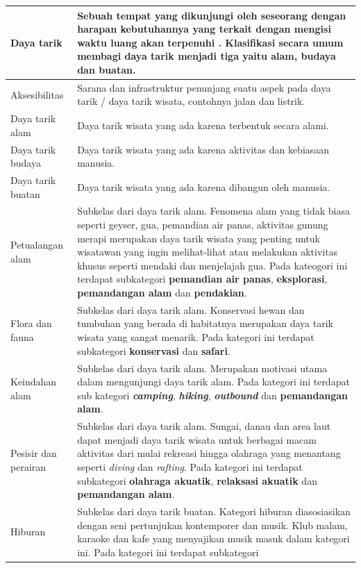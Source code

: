 \begin{center}
\begin{longtable}{ |l|m{10cm}| }
	\hline
	Daya tarik & Sebuah tempat yang dikunjungi oleh seseorang dengan harapan kebutuhannya yang terkait dengan mengisi waktu luang akan terpenuhi
	\cite{inskeep1991tourism}. Klasifikasi secara umum membagi daya tarik menjadi tiga yaitu alam, budaya dan buatan.\\
	\hline
	Aksesibilitas & Sarana dan infrastruktur penunjang suatu aspek pada daya tarik / daya tarik wisata, contohnya jalan dan listrik.\\
	\hline
	Daya tarik alam & Daya tarik wisata yang ada karena terbentuk secara alami.\\ 
	\hline
	Daya tarik budaya & Daya tarik wisata yang ada karena aktivitas dan kebiasaan manusia.\\
	\hline
	Daya tarik buatan & Daya tarik wisata yang ada karena dibangun oleh manusia.\\
	\hline
	Petualangan alam & Subkelas dari daya tarik alam. Fenomena alam yang tidak biasa seperti geyser, gua, pemandian air panas, aktivitas gunung
	merapi merupakan daya tarik wisata yang penting untuk wisatawan yang ingin melihat-lihat atau melakukan aktivitas khusus seperti
	mendaki dan menjelajah gua. Pada kateogori ini terdapat subkategori \textbf{pemandian air panas}, \textbf{eksplorasi}, 
	\textbf{pemandangan alam} dan \textbf{pendakian}.\\
	\hline
	Flora dan fauna & Subkelas dari daya tarik alam. Konservasi hewan dan tumbuhan yang berada di habitatnya merupakan daya tarik wisata yang
	sangat menarik. Pada kategori ini terdapat subkategori \textbf{konservasi} dan \textbf{safari}.\\
	\hline
	Keindahan alam & Subkelas dari daya tarik alam. Merupakan motivasi utama dalam mengunjungi daya tarik alam. Pada kategori ini terdapat sub 
	kategori \textbf{\textit{camping}}, \textbf{\textit{hiking}}, \textbf{\textit{outbound}} dan \textbf{pemandangan alam}.\\
	\hline
	Pesisir dan perairan & Subkelas dari daya tarik alam. Sungai, danau dan area laut dapat menjadi daya tarik wisata untuk berbagai
	macam aktivitas dari mulai rekreasi hingga olahraga yang menantang seperti \textit{diving} dan \textit{rafting}. Pada kategori ini
	terdapat subkategori \textbf{olahraga akuatik}, \textbf{relaksasi akuatik} dan \textbf{pemandangan alam}.\\
	\hline
	Hiburan & Subkelas dari daya tarik buatan. Kategori hiburan diasosiasikan dengan seni pertunjukan kontemporer dan musik. Klub malam,
	karaoke dan kafe yang menyajikan musik masuk dalam kategori ini. Pada kategori ini terdapat subkategori 

\end{longtable}
\end{center}
